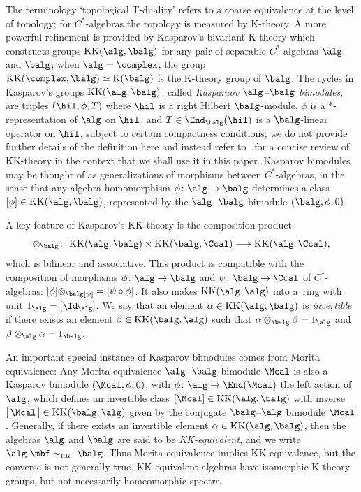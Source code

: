 The terminology `topological T-duality' refers to a coarse equivalence at
the level of topology; for $C^*$-algebras the topology is measured by
K-theory. A more powerful refinement is provided by Kasparov's bivariant
K-theory which constructs groups ${\rm KK}(\alg,\balg)$ for any pair
of separable $C^*$-algebras $\alg$ and $\balg$; when $\alg=\complex$,
the group ${\rm KK}(\complex,\balg)\simeq {\rm
 K}(\balg)$ is the K-theory group of $\balg$. The cycles in
Kasparov's groups ${\rm KK}(\alg,\balg)$, called \emph{Kasparaov
 $\alg$--$\balg$ bimodules}, are triples $(\hil,\phi,T)$ where $\hil$
is a right Hilbert $\balg$-module, $\phi$ is a $*$-representation of $\alg$
on $\hil$, and $T\in\End_\balg(\hil)$ is a $\balg$-linear operator on
$\hil$, subject to certain compactness conditions; we do not
provide further details of the definition here and instead refer to~\cite{Brodzki2006} for a
concise review of KK-theory in the context that we shall use it
in this paper. Kasparov bimodules may be thought of as generalizations
of morphisms between $C^*$-algebras, in the sense that any algebra homomorphism $\phi\colon \alg\to\balg$
determines a class $[\phi]\in{\rm KK}(\alg,\balg)$, represented by the
$\alg$--$\balg$-bimodule $(\balg,\phi,0)$.

A key feature of Kasparov's KK-theory is the composition product
\[
\otimes_\balg\colon \ {\rm KK}(\alg,\balg)\times{\rm
 KK}(\balg,\Ccal)\longrightarrow{\rm KK}(\alg,\Ccal) ,
\]
which is bilinear and associative. This product is compatible with the
composition of morphisms $\phi\colon \alg\to\balg$ and $\psi\colon \balg\to\Ccal$
of $C^*$-algebras: $[\phi]\otimes_\balg[\psi] = [\psi\circ\phi]$. It
also makes ${\rm KK}(\alg,\alg)$ into a~ring with unit
$1_\alg=[\Id_\alg]$. We say that an element $\alpha\in{\rm
 KK}(\alg,\balg)$ is \emph{invertible} if there exists an element
$\beta\in{\rm KK}(\balg,\alg)$ such that
$\alpha\otimes_\balg\beta=1_\alg$ and
$\beta\otimes_\alg\alpha=1_\balg$.

An important special instance of Kasparov
bimodules comes from Morita equivalence: Any Morita equivalence
$\alg$--$\balg$ bimodule $\Mcal$ is also a Kasparov bimodule
$(\Mcal,\phi,0)$, with $\phi\colon \alg\to\End(\Mcal)$ the left action of
$\alg$, which defines an invertible class $[\Mcal]\in{\rm
 KK}(\alg,\balg)$ with inverse $[\,\overline{\Mcal}\,]\in{\rm
 KK}(\balg,\alg)$ given by the conjugate $\balg$--$\alg$ bimodule
$\overline{\Mcal}$. Generally, if there exists an invertible element
$\alpha\in{\rm KK}(\alg,\balg)$, then the algebras $\alg$ and $\balg$
are said to be \emph{{KK}-equivalent}, and we write $\alg\
\mbf\sim_{\text{\tiny{KK}}}\ \balg$. Thus Morita equivalence implies
KK-equivalence, but the converse is not generally true. KK-equivalent algebras have isomorphic
K-theory groups, but not necessarily homeomorphic spectra.

